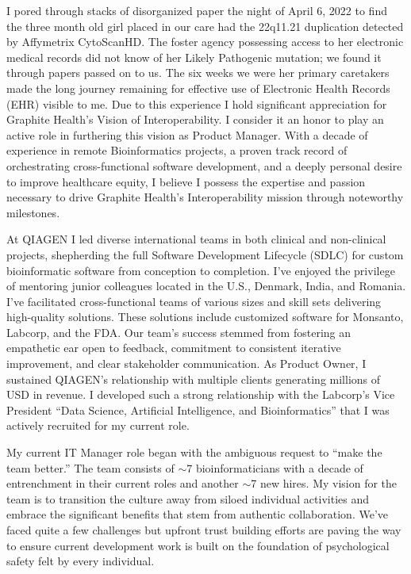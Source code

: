\documentclass[10pt,letterpaper]{article}
\begin{document}
\begin{flushleft}
	I pored through stacks of disorganized paper the night of April 6, 2022 to find the three month old girl placed in our care had the 22q11.21 duplication detected by Affymetrix CytoScanHD. The foster agency possessing access to her electronic medical records did not know of her Likely Pathogenic mutation; we found it through papers passed on to us. The six weeks we were her primary caretakers made the long journey remaining for effective use of Electronic Health Records (EHR) visible to me. Due to this experience I hold significant appreciation for Graphite Health\rq{}s Vision of Interoperability. I consider it an honor to play an active role in furthering this vision as Product Manager. With a decade of experience in remote Bioinformatics projects, a proven track record of orchestrating cross-functional software development, and a deeply personal desire to improve healthcare equity, I believe I possess the expertise and passion necessary to drive Graphite Health\rq{}s Interoperability mission through noteworthy milestones.
	
	At QIAGEN I led diverse international teams in both clinical and non-clinical projects, shepherding the full Software Development Lifecycle (SDLC) for custom bioinformatic software from conception to completion. I\rq{}ve enjoyed the privilege of mentoring junior colleagues located in the U.S., Denmark, India, and Romania. I\rq{}ve facilitated cross-functional teams of various sizes and skill sets delivering high-quality solutions. These solutions include customized software for Monsanto, Labcorp, and the FDA. Our team\rq{}s success stemmed from fostering an empathetic ear open to feedback, commitment to consistent iterative improvement, and clear stakeholder communication. As Product Owner, I sustained QIAGEN's relationship with multiple clients generating millions of USD in revenue. I developed such a strong relationship with the Labcorp\rq{}s Vice President  “Data Science, Artificial Intelligence, and Bioinformatics” that I was actively recruited for my current role. 
	 
	My current IT Manager role began with the ambiguous request to “make the team better.” The team consists of \(\sim \)7 bioinformaticians with a decade of entrenchment in their current roles and another \(\sim \)7 new hires. My vision for the team is to transition the culture away from siloed individual activities and embrace the significant benefits that stem from authentic collaboration. We\rq{}ve faced quite a few challenges but upfront trust building efforts are paving the way to ensure current development work is built on the foundation of psychological safety felt by every individual.  
	

\end{flushleft}
\end{document}
